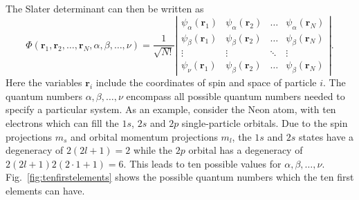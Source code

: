 The Slater determinant can then be written as   
\begin{equation}
  \Phi(\mathbf{r}_1,\mathbf{r}_2,\dots,\mathbf{r}_N,\alpha,\beta,\dots,\nu)  = \frac{1}{\sqrt{N!}}\left| 
  \begin{array}{cccc}
    \psi_{\alpha}(\mathbf{r}_1)&\psi_{\alpha}(\mathbf{r}_2)&\dots&\psi_{\alpha}(\mathbf{r}_N) \\ [4pt]
    \psi_{\beta}(\mathbf{r}_1)&\psi_{\beta}(\mathbf{r}_2)&\dots&\psi_{\beta}(\mathbf{r}_N) \\[4pt] 
    \vdots              & \vdots            &\ddots&\vdots\\[4pt]
    \psi_{\nu}(\mathbf{r}_1)&\psi_{\beta}(\mathbf{r}_2)&\dots&\psi_{\beta}(\mathbf{r}_N)
  \end{array}
  \right|.
\label{HartreeFockDet}
\end{equation}
Here the variables $\mathbf{r}_i$ include the coordinates of 
spin and space of particle $i$. The quantum numbers $\alpha,\beta,\dots,\nu$ encompass all possible quantum numbers needed to specify a 
particular system. As an example, consider the Neon atom, with ten electrons which can fill the $1s$, $2s$ and $2p$ single-particle
orbitals. Due to the spin projections $m_s$ and orbital momentum projections $m_l$, the $1s$ and $2s$ states have  a degeneracy of $2(2l+1)=2$ while the $2p$ orbital has
a degeneracy of $2(2l+1) 2(2\cdot 1+1)= 6$.  This leads to ten possible values for  $\alpha,\beta,\dots,\nu$.  
Fig.~\ref{fig:tenfirstelements} shows the possible quantum numbers which the ten first elements can have.
%
